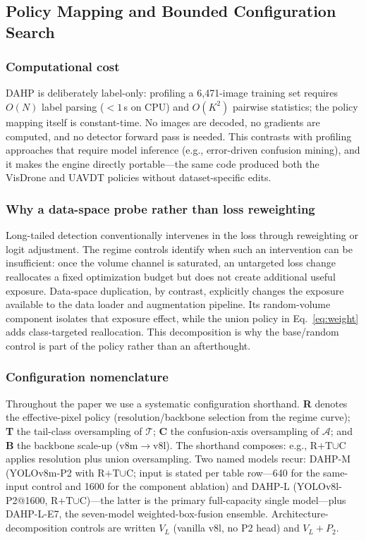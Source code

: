 \documentclass[journal]{IEEEtran}
\newcommand{\dahpL}{DAHP-L}
\newcommand{\dahpM}{DAHP-M}
\begin{document}
\subsection{Policy Mapping and Bounded Configuration Search}
\subsubsection{Computational cost}
DAHP is deliberately label-only: profiling a 6{,}471-image training set requires $O(N)$ label parsing ($<1$\,s on CPU) and $O(K^2)$ pairwise statistics; the policy mapping itself is constant-time. No images are decoded, no gradients are computed, and no detector forward pass is needed. This contrasts with profiling approaches that require model inference (e.g., error-driven confusion mining), and it makes the engine directly portable---the same code produced both the VisDrone and UAVDT policies without dataset-specific edits.

\subsubsection{Why a data-space probe rather than loss reweighting}
Long-tailed detection conventionally intervenes in the loss through reweighting or logit adjustment. The regime controls identify when such an intervention can be insufficient: once the volume channel is saturated, an untargeted loss change reallocates a fixed optimization budget but does not create additional useful exposure. Data-space duplication, by contrast, explicitly changes the exposure available to the data loader and augmentation pipeline. Its random-volume component isolates that exposure effect, while the union policy in Eq.~\eqref{eq:weight} adds class-targeted reallocation. This decomposition is why the base/random control is part of the policy rather than an afterthought.

\subsubsection{Configuration nomenclature}
Throughout the paper we use a systematic configuration shorthand. \textbf{R} denotes the effective-pixel policy (resolution/backbone selection from the regime curve); \textbf{T} the tail-class oversampling of $\mathcal{T}$; \textbf{C} the confusion-axis oversampling of $\mathcal{A}$; and \textbf{B} the backbone scale-up (v8m$\to$v8l). The shorthand composes: e.g., R$+$T$\cup$C applies resolution plus union oversampling. Two named models recur: \dahpM{} (YOLOv8m-P2 with R$+$T$\cup$C; input is stated per table row---640 for the same-input control and 1600 for the component ablation) and \dahpL{} (YOLOv8l-P2@1600, R$+$T$\cup$C)---the latter is the primary full-capacity single model---plus \dahpL{}-E7, the seven-model weighted-box-fusion ensemble. Architecture-decomposition controls are written $V_L$ (vanilla v8l, no P2 head) and $V_L{+}P_2$.
\end{document}
